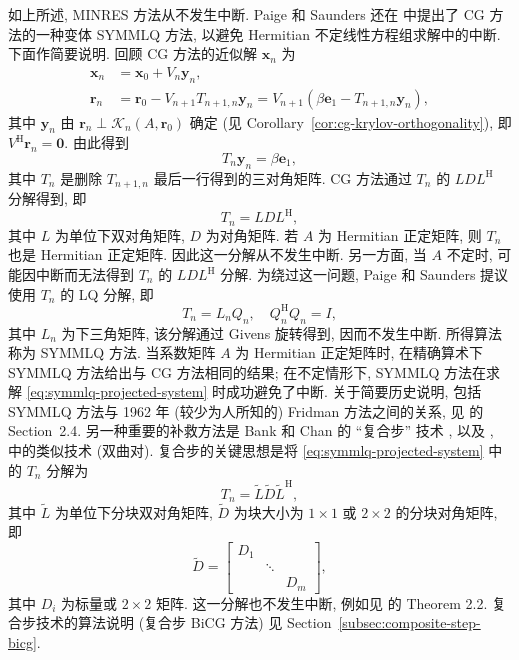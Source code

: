 {如上所述, MINRES 方法从不发生中断. Paige 和 Saunders 还在  中提出了 CG 方法的一种变体 SYMMLQ 方法, 以避免 Hermitian 不定线性方程组求解中的中断. 下面作简要说明. 回顾 CG 方法的近似解 $\bm x_n$ 为}
\[\begin{aligned}
\bm x_n&=\bm x_0+V_n\bm y_n,\\
\bm r_n&=\bm r_0-V_{n+1}T_{n+1,n}\bm y_n=V_{n+1}(\beta\bm e_1-T_{n+1,n}\bm y_n),
\end{aligned}\]
{其中 $\bm y_n$ 由 $\bm r_n\perp\mathcal K_n(A,\bm r_0)$ 确定 (见 Corollary\ \ref{cor:cg-krylov-orthogonality}), 即 $V^{\mathrm H}\bm r_n=\bm0$. 由此得到}
\begin{equation}\label{eq:symmlq-projected-system}T_n\bm y_n=\beta\bm e_1,\end{equation}
{其中 $T_n$ 是删除 $T_{n+1,n}$ 最后一行得到的三对角矩阵. CG 方法通过 $T_n$ 的 $LDL^{\mathrm H}$ 分解得到, 即}
\[T_n=LDL^{\mathrm H},\]
{其中 $L$ 为单位下双对角矩阵, $D$ 为对角矩阵. 若 $A$ 为 Hermitian 正定矩阵, 则 $T_n$ 也是 Hermitian 正定矩阵. 因此这一分解从不发生中断. 另一方面, 当 $A$ 不定时, 可能因中断而无法得到 $T_n$ 的 $LDL^{\mathrm H}$ 分解.}
{\leavevmode{}\label{idx:chapter-03-section-01:symmlq-lq-factorization}为绕过这一问题, Paige 和 Saunders 提议使用 $T_n$ 的 LQ 分解, 即}
\[T_n=L_nQ_n,\quad Q_n^{\mathrm H}Q_n=I,\]
{其中 $L_n$ 为下三角矩阵, 该分解通过 Givens 旋转得到, 因而不发生中断. 所得算法称为 \linebreak[4]SYMMLQ 方法. 当系数矩阵 $A$ 为 Hermitian 正定矩阵时, 在精确算术下 SYMMLQ 方法给出与 CG 方法相同的结果; 在不定情形下, SYMMLQ 方法在求解 \eqref{eq:symmlq-projected-system} 时成功避免了中断. 关于简要历史说明, 包括 SYMMLQ 方法与 1962 年 (较少为人所知的) Fridman 方法之间的关系, 见  的 Section\ 2.4.}
{另一种重要的补救方法是 Bank 和 Chan 的 ``复合步'' 技术 , 以及 ,  中的类似技术 (双曲对). 复合步的关键思想是将 \eqref{eq:symmlq-projected-system} 中的 $T_n$ 分解为}
\[T_n=\widetilde L\widetilde D\widetilde L^{\mathrm H},\]
{其中 $\widetilde L$ 为单位下分块双对角矩阵, $\widetilde D$ 为块大小为 $1\times1$ 或 $2\times2$ 的分块对角矩阵, 即}
\[\widetilde D=\begin{bmatrix}D_1&&\\&\ddots&\\&&D_m\end{bmatrix},\]
{其中 $D_i$ 为标量或 $2\times2$ 矩阵. 这一分解也不发生中断, 例如见  的 Theorem 2.2. 复合步技术的算法说明 (复合步 BiCG 方法) 见 Section\ \ref{subsec:composite-step-bicg}.}
